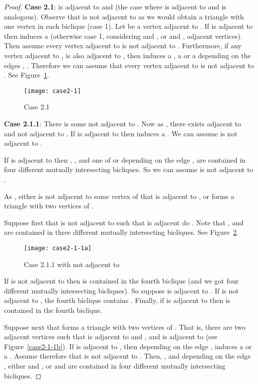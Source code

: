 \documentclass[12pt]{article}
\begin{document}
\begin{proof}
\textbf{Case 2.1}:  is adjacent to  and  (the case where  is
adjacent to  and  is analogous).  Observe that  is not adjacent
to  as  we would obtain a  triangle with one vertex  in each biclique
(case 1).  Let   be  a vertex  adjacent to  . If   is
adjacent to   then   induces a   (otherwise
case 1, considering  and , or  and , adjacent vertices).  Then  assume every vertex  adjacent to   is not
adjacent to . Furthermore, if any vertex  adjacent to , 
is also adjacent to , then  induces a , a  or a  depending
on the edges , . Therefore we can assume that every vertex  adjacent to   is not adjacent to .
See Figure~\ref{case2-1}.

\FloatBarrier
\begin{figure}[h]
	\centering
	\texttt{[image: case2-1]}
	\caption{Case 2.1}
	\label{case2-1}
\end{figure}
\FloatBarrier

\textbf{Case 2.1.1}: There  is some  not adjacent to  .  Now as , there  exists  adjacent to   and not adjacent
to  .  If    is adjacent  to   then   induces  a
. We can assume  is not adjacent to .  

If  is adjacent to  then , ,  and
one of  or  depending on the edge , are contained
in four different mutually intersecting bicliques. So we can assume 
is not adjacent to .

As ,  either  is not adjacent to some vertex of
 that is adjacent to , or  forms a triangle with two vertices of
. 

Suppose first that  is not adjacent to   such that  is
adjacent do .  Note that ,  and 
are contained  in three  different mutually intersecting  bicliques. See
Figure~\ref{case2-1-1a}.

\FloatBarrier
\begin{figure}[h]
	\centering
	\texttt{[image: case2-1-1a]}
	\caption{Case 2.1.1 with  not adjacent to }
	\label{case2-1-1a}
\end{figure}
\FloatBarrier

If  is  not adjacent  to   then   is contained  in the
fourth  biclique  (and  we  got  four  different  mutually  intersecting
bicliques).  So suppose   is adjacent to . If   is not adjacent
to , the fourth biclique  contains .  Finally, if  is adjacent
to  then   is contained  in the
fourth biclique.

Suppose next that  forms a triangle with two vertices of . That is, there are two adjacent vertices   such that  is adjacent to  and , and  is adjacent
to  (see Figure~\ref{case2-1-1b}).  If  is adjacent to , 
then depending on the  edge  ,   induces a  or a 
. Assume therefore that   is  not  adjacent  to  . 
Then, ,  and depending on the edge , either  and , 
or   and    are  contained  in  four  different
mutually  intersecting  bicliques.  



\end{proof}
\end{document}
